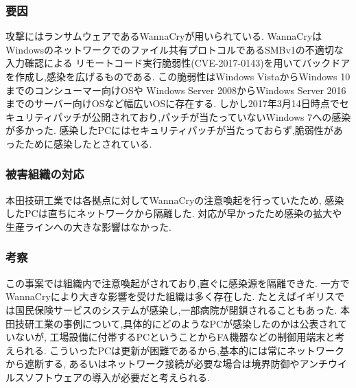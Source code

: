 \documentclass[uplatex,a4j,11pt,dvipdfmx]{jsarticle}
\begin{document}
\subsubsection{要因}
攻撃にはランサムウェアであるWannaCryが用いられている.
WannaCryはWindowsのネットワークでのファイル共有プロトコルであるSMBv1の不適切な入力確認による
リモートコード実行脆弱性(CVE-2017-0143)を用いてバックドアを作成し,感染を広げるものである.
この脆弱性はWindows VistaからWindows 10までのコンシューマー向けOSや
Windows Server 2008からWindows Server 2016までのサーバー向けOSなど幅広いOSに存在する.\cite{JVNDB20175:online}
しかし2017年3月14日時点でセキュリティパッチが公開されており,パッチが当たっていないWindows 7への感染が多かった.
感染したPCにはセキュリティパッチが当たっておらず,脆弱性があったために感染したとされている.\cite{nikkeihonda}
\subsubsection{被害組織の対応}
本田技研工業では各拠点に対してWannaCryの注意喚起を行っていたため,
感染したPCは直ちにネットワークから隔離した.
対応が早かったため感染の拡大や生産ラインへの大きな影響はなかった.\cite{nikkeihonda}
\subsubsection{考察}
この事案では組織内で注意喚起がされており,直ぐに感染源を隔離できた.
一方でWannaCryにより大きな影響を受けた組織は多く存在した.
たとえばイギリスでは国民保険サービスのシステムが感染し,一部病院が閉鎖されることもあった.\cite{eikoku:online}
本田技研工業の事例について,具体的にどのようなPCが感染したのかは公表されていないが,
工場設備に付帯するPCということからFA機器などの制御用端末と考えられる.
こういったPCは更新が困難であるから,基本的には常にネットワークから遮断する,
あるいはネットワーク接続が必要な場合は境界防御やアンチウイルスソフトウェアの導入が必要だと考えられる.

\end{document}
